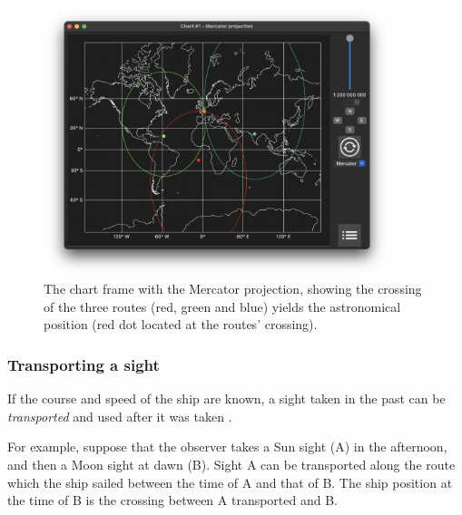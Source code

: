 \documentclass{ol-softwaremanual}
\begin{document}
\begin{figure}
  \centering
  \includegraphics[width=0.9\textwidth]{figures/astronomical-position-mercator.png}
  \caption{
    \label{fig-astronomical-position}
    The chart frame with the Mercator projection, showing the crossing of the three routes (red, green and blue) yields the astronomical position (red dot located at the routes' crossing).  
  }
\end{figure}


\subsubsection{Transporting a sight}\label{section-transporting-sight}

If the course and speed of the ship are known, a sight taken in the past can be \textit{transported} and used after it was taken \cite{bowditch2002the,noauthor2017cours}. 

For example, suppose that the observer takes a Sun sight (A) in the afternoon, and then a Moon sight at dawn (B). Sight A can be transported along the route which the ship sailed between the time of A and that of B. The ship position at the time of B is the crossing between A transported and B. 
\end{document}
